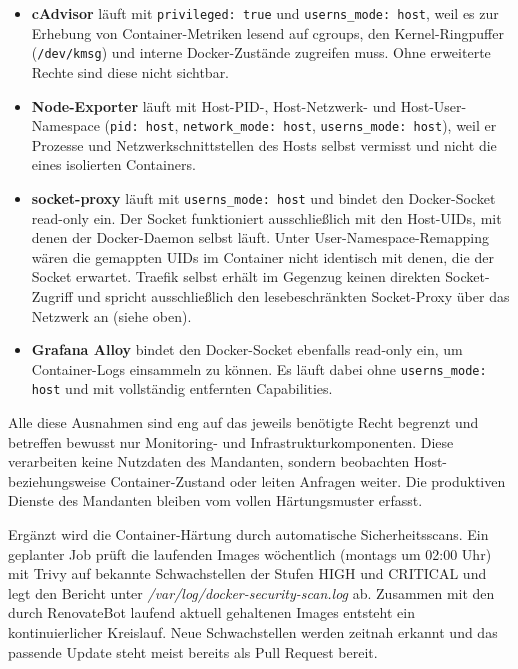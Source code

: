 \begin{itemize}
  \item \textbf{cAdvisor} läuft mit \texttt{privileged: true} und
    \texttt{userns\_mode: host}, weil es zur Erhebung von Container-Metriken
    lesend auf cgroups, den Kernel-Ringpuffer (\texttt{/dev/kmsg}) und
    interne Docker-Zustände zugreifen muss. Ohne erweiterte Rechte sind diese
    nicht sichtbar.
  \item \textbf{Node-Exporter} läuft mit Host-PID-, Host-Netzwerk- und
    Host-User-Namespace (\texttt{pid: host}, \texttt{network\_mode: host},
    \texttt{userns\_mode: host}), weil er Prozesse und
    Netzwerkschnittstellen des Hosts selbst vermisst und nicht die eines
    isolierten Containers.
  \item \textbf{socket-proxy} läuft mit \texttt{userns\_mode: host} und
    bindet den Docker-Socket read-only ein. Der Socket funktioniert
    ausschließlich mit den Host-\acp{UID}, mit denen der Docker-Daemon selbst
    läuft. Unter User-Namespace-Remapping wären die gemappten \acp{UID} im
    Container nicht identisch mit denen, die der Socket erwartet. Traefik
    selbst erhält im Gegenzug keinen direkten Socket-Zugriff und spricht
    ausschließlich den lesebeschränkten Socket-Proxy über das Netzwerk an
    (siehe oben).
  \item \textbf{Grafana Alloy} bindet den Docker-Socket ebenfalls read-only
    ein, um Container-Logs einsammeln zu können. Es läuft dabei ohne
    \texttt{userns\_mode: host} und mit vollständig entfernten Capabilities.
\end{itemize}

Alle diese Ausnahmen sind eng auf das jeweils benötigte Recht begrenzt und
betreffen bewusst nur Monitoring- und Infrastrukturkomponenten. Diese
verarbeiten keine Nutzdaten des Mandanten, sondern beobachten Host-
beziehungsweise Container-Zustand oder leiten Anfragen weiter. Die
produktiven Dienste des Mandanten bleiben vom vollen Härtungsmuster erfasst.

Ergänzt wird die Container-Härtung durch automatische Sicherheitsscans. Ein
geplanter Job prüft die laufenden Images wöchentlich (montags um 02:00 Uhr)
mit Trivy auf bekannte Schwachstellen der Stufen HIGH und CRITICAL und legt
den Bericht unter \textit{/var/log/docker-security-scan.log} ab. Zusammen mit
den durch RenovateBot laufend aktuell gehaltenen Images entsteht ein
kontinuierlicher Kreislauf. Neue Schwachstellen werden zeitnah erkannt und
das passende Update steht meist bereits als Pull Request bereit.


